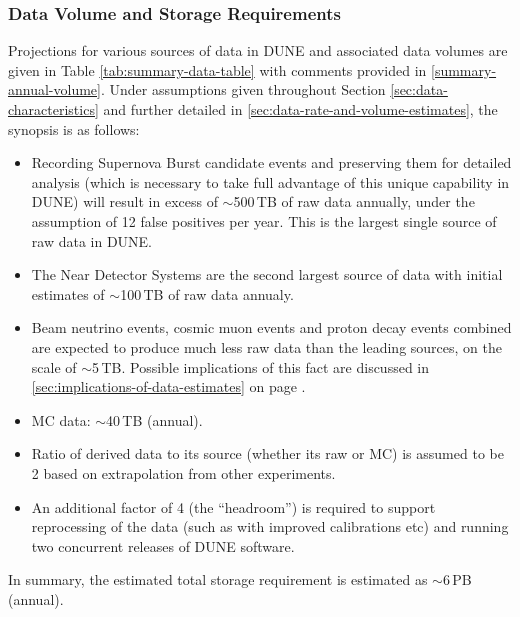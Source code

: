 \subsubsection{Data Volume and Storage Requirements}
Projections for various sources of data in DUNE and associated data volumes are given in
Table \ref{tab:summary-data-table} with comments provided in \ref{summary-annual-volume}.
Under assumptions given throughout Section \ref{sec:data-characteristics} and further detailed
in \ref{sec:data-rate-and-volume-estimates}, the synopsis is as follows:
\begin{itemize}

\item Recording Supernova Burst candidate events and preserving them for detailed analysis (which is necessary to take
full advantage of this unique capability in DUNE) will result in excess of $\sim$500\,TB of raw data annually, under the assumption
of 12 false positives per year. This is the largest single source of raw data in DUNE.

\item The Near Detector Systems are the second largest source of data with initial estimates of $\sim$100\,TB of raw data annualy.

\item Beam neutrino events, cosmic muon events and proton decay events combined are expected to produce
much less raw data than the leading sources, on the scale of  $\sim$5\,TB. Possible implications of this fact
are discussed in \ref{sec:implications-of-data-estimates} on page \pageref{sec:implications-of-data-estimates}.

\item MC data: $\sim$40\,TB (annual).

\item Ratio of derived data to its source (whether its raw or MC) is assumed to be 2 based on extrapolation from other experiments.

\item An additional factor of 4 (the ``headroom'') is required to support reprocessing of the data (such as with improved calibrations etc)
and running two concurrent releases of DUNE software.

\end{itemize}

In summary, the estimated total storage requirement is estimated as $\sim$6\,PB (annual).


